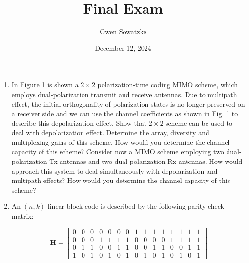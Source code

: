 \documentclass[fleqn]{article}
\title{Final Exam}
\author{Owen Sowatzke}
\date{December 12, 2024}
\makeatletter
\newcommand{\zerodisplayskip}{
	\setlength{\abovedisplayskip}{0pt}%
	\setlength{\belowdisplayskip}{0pt}%
	\setlength{\abovedisplayshortskip}{0pt}%
	\setlength{\belowdisplayshortskip}{0pt}%
	\setlength{\mathindent}{0pt}}
\newenvironment{equationCenter}{\@fleqnfalse\begin{equation*}}{\end{equation*}}
\makeatother
\begin{document}
	\offinterlineskip
	\setlength{\lineskip}{12pt}
	\setcounter{MaxMatrixCols}{20}
	\zerodisplayskip
	\maketitle
	
	\begin{enumerate}
		\item In Figure 1 is shown a $2 \times 2$ polarization-time coding MIMO scheme, which employs dual-polarization transmit and receive antennas. Due to multipath effect, the initial orthogonality of polarization states is no longer preserved on a receiver side and we can use the channel coefficients as shown in Fig. 1 to describe this depolarization effect. Show that $2 \times 2$ scheme can be used to deal with depolarization effect. Determine the array, diversity and multiplexing gains of this scheme. How would you determine the channel capacity of this scheme? Consider now a MIMO scheme employing two dual-polarization Tx antennas and two dual-polarization Rx antennas. How would approach this system to deal simultaneously with depolarization and multipath effects? How would you determine the channel capacity of this scheme?

		\begin{figure}[H]
			\centerline{}
			\caption{}
			\label{fig::2x2_polarization_time_coding_mimo}
		\end{figure}

		\item An $(n,k)$ linear block code is described by the following parity-check matrix:
		
		\begin{equationCenter}
			\mathbf{H} = \begin{bmatrix}
				0 & 0 & 0 & 0 & 0 & 0 & 0 & 1 & 1 & 1 & 1 & 1 & 1 & 1 & 1 \\
				0 & 0 & 0 & 1 & 1 & 1 & 1 & 0 & 0 & 0 & 0 & 1 & 1 & 1 & 1 \\
				0 & 1 & 1 & 0 & 0 & 1 & 1 & 0 & 0 & 1 & 1 & 0 & 0 & 1 & 1 \\
				1 & 0 & 1 & 0 & 1 & 0 & 1 & 0 & 1 & 0 & 1 & 0 & 1 & 0 & 1
			\end{bmatrix}
		\end{equationCenter}
		

\end{enumerate}
\end{document}
